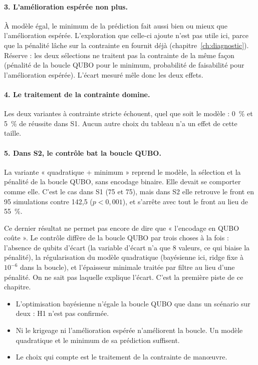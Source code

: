 \paragraph{3. L'amélioration espérée non plus.} À modèle égal, le minimum de la prédiction fait aussi bien ou mieux que l'amélioration espérée. L'exploration que celle-ci ajoute n'est pas utile ici, parce que la pénalité lâche sur la contrainte en fournit déjà (chapitre~\ref{ch:diagnostic}). Réserve : les deux sélections ne traitent pas la contrainte de la même façon (pénalité de la boucle QUBO pour le minimum, probabilité de faisabilité pour l'amélioration espérée). L'écart mesuré mêle donc les deux effets.

\paragraph{4. Le traitement de la contrainte domine.} Les deux variantes à contrainte stricte échouent, quel que soit le modèle : 0~\% et 5~\% de réussite dans S1. Aucun autre choix du tableau n'a un effet de cette taille.

\paragraph{5. Dans S2, le contrôle bat la boucle QUBO.} La variante « quadratique + minimum » reprend le modèle, la sélection et la pénalité de la boucle QUBO, sans encodage binaire. Elle devait se comporter comme elle. C'est le cas dans S1 (75 et 75), mais dans S2 elle retrouve le front en 95 simulations contre 142,5 ($p<0{,}001$), et s'arrête avec tout le front au lieu de 55~\%.

\begin{piege}
Ce dernier résultat ne permet pas encore de dire que « l'encodage en QUBO coûte ». Le contrôle diffère de la boucle QUBO par trois choses à la fois : l'absence de qubits d'écart (la variable d'écart n'a que 8 valeurs, ce qui biaise la pénalité), la régularisation du modèle quadratique (bayésienne ici, ridge fixe à $10^{-6}$ dans la boucle), et l'épaisseur minimale traitée par filtre au lieu d'une pénalité. On ne sait pas laquelle explique l'écart. C'est la première piste de ce chapitre.
\end{piege}

\begin{resultat}
\begin{itemize}
\item L'optimisation bayésienne n'égale la boucle QUBO que dans un scénario sur deux : H1 n'est pas confirmée.
\item Ni le krigeage ni l'amélioration espérée n'améliorent la boucle. Un modèle quadratique et le minimum de sa prédiction suffisent.
\item Le choix qui compte est le traitement de la contrainte de manœuvre.
\end{itemize}
\end{resultat}

